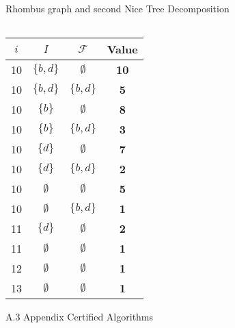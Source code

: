 \documentclass{beamer}
\begin{document}
\begin{frame}{Rhombus graph and second Nice Tree Decomposition}
\begin{minipage}{0.3\textwidth}
\begin{tabular}{|c| >{\footnotesize}c | >{\footnotesize}c | >{\footnotesize}c |}
    \end{tabular}
  \end{minipage}
    \begin{minipage}{0.3\textwidth}
    \renewcommand{\arraystretch}{0.3} 
    \setlength{\tabcolsep}{0.7pt} 
    \begin{tabular}{|c| >{\footnotesize}c | >{\footnotesize}c | >{\footnotesize}c |}
    \hline
    \textbf{\(i\)} & \textbf{\(I\)} & \textbf{\(\mathcal{F}\)} & \textbf{Value} \\
    \hline
    10 & $\{b,d\}$ & $\emptyset$ & \textbf{10} \\
    10 & $\{b,d\}$ & $\{b,d\}$ & \textbf{5} \\
    10 & $\{b\}$ & $\emptyset$ & \textbf{8} \\
    10 & $\{b\}$ & $\{b,d\}$ & \textbf{3} \\
    10 & $\{d\}$ & $\emptyset$ & \textbf{7} \\
    10 & $\{d\}$ & $\{b,d\}$ & \textbf{2} \\
    10 & $\emptyset$ & $\emptyset$ & \textbf{5} \\
    10 & $\emptyset$ & $\{b,d\}$ & \textbf{1} \\
    \hline
    11 & $\{d\}$ & $\emptyset$ & \textbf{2} \\
    11 & $\emptyset$ & $\emptyset$ & \textbf{1} \\
    \hline
    12 & $\emptyset$ & $\emptyset$ & \textbf{1} \\
    \hline
    13 & $\emptyset$ & $\emptyset$ & \textbf{1} \\
    \hline
    \end{tabular}
  \end{minipage}

\end{frame}




\begin{frame}{A.3}
  \hypertarget{appendix-a3}{}
  \centering
  \Huge Appendix Certified Algorithms
\end{frame}
\end{document}
